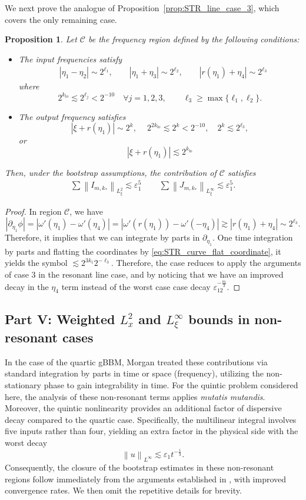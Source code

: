 \documentclass[reqno,english,11pt]{amsart}
\newcommand{\eps}{\varepsilon}
\newcommand{\snorm}[1]{\left\|#1\right\|}
\newtheorem{proposition}[theorem]{Proposition}
\theoremstyle{definition}
\numberwithin{equation}{section}
\begin{document}
We next prove the analogue of Proposition~\eqref{prop:STR_line_case_3}, which covers the only remaining case.
\begin{proposition}\label{prop:STR_curve_only_remaining_case}
    Let $\mathcal{C}$ be the frequency region defined by the following conditions:
\begin{itemize}
    \item The input frequencies satisfy
\begin{align*}
&|\eta_1-\eta_2|\sim 2^{\ell_1}, \qquad
|\eta_1+\eta_3|\sim 2^{\ell_2}, \qquad
|r(\eta_1)+\eta_4|\sim 2^{\ell_3}
\end{align*}
where
$$2^{k_{\mathrm{lo}}}\lesssim 2^{\ell_j}<2^{-10}\quad \forall j=1,2,3, 
\qquad \ell_3\ge \max\{\ell_1,\ell_2\}.$$
    \item The output frequency satisfies 
    $$|\xi+r(\eta_1)|\sim 2^{k}, \quad \ 2^{2k_{\operatorname{lo}}} \lesssim 2^{k}<2^{-10}, \quad 2^k  \lesssim 2^{\ell_3},$$
    or
    $$ |\xi+r(\eta_1)|\lesssim 2^{k_{\operatorname{lo}}}$$
\end{itemize}
Then, under the bootstrap assumptions, the contribution of $\mathcal{C}$ satisfies
    \begin{align*}
        \sum\snorm{I_{m,k_*}}_{L^2_\xi}\lesssim \eps_1^5\,\qquad\sum\snorm{J_{m,k_*}}_{L^\infty_\xi}\lesssim \eps_1^5.
    \end{align*}
\end{proposition}
\begin{proof}
In region $\mathcal{C}$, we have 
$$\left|\partial_{\eta_1}\phi\right|=|\omega'(\eta_1)-\omega'(\eta_4)|=|\omega'\left(r(\eta_1)\right)-\omega'(-\eta_4)|\gtrsim |r(\eta_1)+\eta_4| \sim 2^{\ell_3}.$$ Therefore, it implies that we can integrate by parts in $\partial_{\eta_1}$. One time integration by parts and flatting the coordinates by \eqref{eq:STR_curve_flat_coordinate}, it yields the symbol $\lesssim 2^{3k_1}2^{-\ell_3}$. Therefore, the case reduces to apply the arguments of case 3 in the resonant line case, and by noticing that we have an improved decay in the $\eta_4$ term instead of the worst case case decay $\eps_12^{-\frac{m}{3}}$.
\end{proof}
\subsection{Part V: Weighted $L^2_x$ and $L^\infty_\xi$ bounds in non-resonant cases}
In the case of the quartic gBBM, Morgan \cite{Morgan} treated these contributions via standard integration by parts in time or space (frequency), utilizing the non-stationary phase to gain integrability in time.
For the quintic problem considered here, the analysis of these non-resonant terms applies \textit{mutatis mutandis}. Moreover, the quintic nonlinearity provides an additional factor of dispersive decay compared to the quartic case. Specifically, the multilinear integral involves five inputs rather than four, yielding an extra factor  in the physical side with the worst decay
$$\snorm{u}_{L^\infty} \lesssim \eps_1 t^{-\frac{1}{3}}.$$ Consequently, the closure of the bootstrap estimates in these non-resonant  regions follow immediately from the arguments established in \cite{Morgan}, with improved convergence rates. We then omit the repetitive details for brevity.
\end{document}
